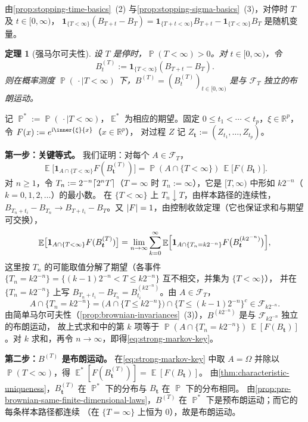 \documentclass[UTF8,11pt,a4paper,oneside,fontset=fandol]{ctexrep}
\makeatletter
\numberwithin{equation}{section}
\theoremstyle{zhthm}
\newtheorem{theorem}{定理}[section]
\renewenvironment{proof}[1][\proofname]{\par
  \pushQED{\qed}%
  \normalfont\topsep6\p@\@plus6\p@\relax
  \trivlist
  \item[\hskip\labelsep\bfseries#1\hspace{0.5em}]\ignorespaces
}{%
  \popQED\endtrivlist\@endpefalse
}
\renewcommand{\proofname}{证明}
\newcommand{\R}{\mathbb{R}}
\newcommand{\F}{\mathcal{F}}
\DeclareMathOperator{\Prob}{\mathbb{P}}
\DeclareMathOperator{\E}{\mathbb{E}}
\newcommand{\iu}{\mathrm{i}}
\newcommand{\ind}[1]{\mathbf{1}_{#1}}
\DeclarePairedDelimiter{\abs}{\lvert}{\rvert}
\DeclarePairedDelimiter{\ceil}{\lceil}{\rceil}
\makeatother
\begin{document}
由\cref{prop:stopping-time-basics}~(2) 与\cref{prop:stopping-sigma-basics}~(3)，对停时 $T$ 及 $t\in[0,\infty)$，
$\ind{\{T<\infty\}}(B_{T+t}-B_T)=\ind{\{T+t<\infty\}}B_{T+t}-\ind{\{T<\infty\}}B_T$ 是随机变量。

\begin{theorem}[强马尔可夫性]
\label{thm:strong-markov}
设 $T$ 是停时，$\Prob(T<\infty)>0$。对 $t\in[0,\infty)$，令
\[
  B^{(T)}_t:=\ind{\{T<\infty\}}(B_{T+t}-B_T).
\]
则在概率测度 $\Prob(\,\cdot\mid T<\infty)$ 下，$B^{(T)}=(B^{(T)}_t)_{t\in[0,\infty)}$ 是与 $\F_T$ 独立的布朗运动。
\end{theorem}

\begin{proof}
记 $\Prob^*:=\Prob(\,\cdot\mid T<\infty)$，$\E^*$ 为相应的期望。固定 $0\le t_1<\cdots<t_p$，$\xi\in\R^p$，令 $F(x):=e^{\iu\inner{\xi}{x}}$（$x\in\R^p$），
对过程 $Z$ 记 $Z_{\bm t}:=(Z_{t_1},\ldots,Z_{t_p})$。

\textbf{第一步：关键等式。} 我们证明：对每个 $A\in\F_T$，
\begin{equation}
  \label{eq:strong-markov-key}
  \E\bigl[\ind{A\cap\{T<\infty\}}F(B^{(T)}_{\bm t})\bigr]=\Prob(A\cap\{T<\infty\})\,\E\bigl[F(B_{\bm t})\bigr].
\end{equation}
对 $n\ge1$，令 $T_n:=2^{-n}\ceil{2^nT}$（$T=\infty$ 时 $T_n:=\infty$），它是 $[T,\infty)$ 中形如 $k2^{-n}$（$k=0,1,2,\ldots$）的最小数。
在 $\{T<\infty\}$ 上 $T_n\downarrow T$，由样本路径的连续性，$B_{T_n+t_i}-B_{T_n}\to B_{T+t_i}-B_T$。又 $\abs{F}=1$，由控制收敛定理（它也保证求和与期望可交换），
\[
  \E\bigl[\ind{A\cap\{T<\infty\}}F(B^{(T)}_{\bm t})\bigr]
  =\lim_{n\to\infty}\sum_{k=0}^{\infty}\E\Bigl[\ind{A\cap\{T_n=k2^{-n}\}}F\bigl(B^{(k2^{-n})}_{\bm t}\bigr)\Bigr],
\]
这里按 $T_n$ 的可能取值分解了期望（各事件 $\{T_n=k2^{-n}\}=\{(k-1)2^{-n}<T\le k2^{-n}\}$ 互不相交，并集为 $\{T<\infty\}$），
并在 $\{T_n=k2^{-n}\}$ 上写 $B_{T_n+t_i}-B_{T_n}=B^{(k2^{-n})}_{t_i}$。由 $A\in\F_T$，
\[
  A\cap\{T_n=k2^{-n}\}=\bigl(A\cap\{T\le k2^{-n}\}\bigr)\cap\{T\le(k-1)2^{-n}\}^c\in\F_{k2^{-n}}.
\]
由简单马尔可夫性（\cref{prop:brownian-invariances}~(3)），$B^{(k2^{-n})}$ 是与 $\F_{k2^{-n}}$ 独立的布朗运动，
故上式求和中的第 $k$ 项等于 $\Prob(A\cap\{T_n=k2^{-n}\})\,\E[F(B_{\bm t})]$。对 $k$ 求和，再令 $n\to\infty$，即得\cref{eq:strong-markov-key}。

\textbf{\boldmath 第二步：$B^{(T)}$ 是布朗运动。}
在\cref{eq:strong-markov-key} 中取 $A=\Omega$ 并除以 $\Prob(T<\infty)$，得 $\E^*[F(B^{(T)}_{\bm t})]=\E[F(B_{\bm t})]$。
由\cref{thm:characteristic-uniqueness}，$B^{(T)}_{\bm t}$ 在 $\Prob^*$ 下的分布与 $B_{\bm t}$ 在 $\Prob$ 下的分布相同。
由\cref{prop:pre-brownian-same-finite-dimensional-laws}，$B^{(T)}$ 在 $\Prob^*$ 下是预布朗运动；而它的每条样本路径都连续
（在 $\{T=\infty\}$ 上恒为 $0$），故是布朗运动。


\end{proof}
\end{document}
